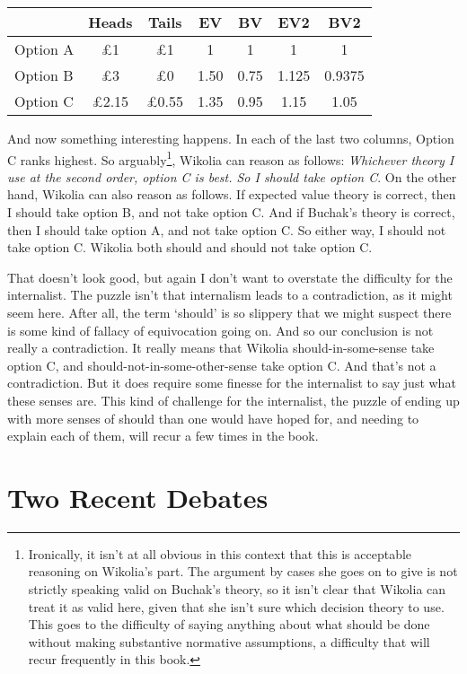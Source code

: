 \documentclass[
  10pt,
  letterpaper,
  twoside]{scrbook}
\begin{document}
\begin{longtable}[]{@{}lcccccc@{}}
\toprule\noalign{}
& Heads & Tails & EV & BV & EV2 & BV2 \\
\midrule\noalign{}
\endhead
\bottomrule\noalign{}
\endlastfoot
Option A & £1 & £1 & 1 & 1 & 1 & 1 \\
Option B & £3 & £0 & 1.50 & 0.75 & 1.125 & 0.9375 \\
Option C & £2.15 & £0.55 & 1.35 & 0.95 & 1.15 & 1.05 \\
\end{longtable}

And now something interesting happens. In each of the last two columns,
Option C ranks highest. So arguably\footnote{Ironically, it isn't at all
  obvious in this context that this is acceptable reasoning on Wikolia's
  part. The argument by cases she goes on to give is not strictly
  speaking valid on Buchak's theory, so it isn't clear that Wikolia can
  treat it as valid here, given that she isn't sure which decision
  theory to use. This goes to the difficulty of saying anything about
  what should be done without making substantive normative assumptions,
  a difficulty that will recur frequently in this book.}, {Wikolia} can
reason as follows: \emph{Whichever theory I use at the second order,
option C is best. So I should take option C}. On the other hand,
{Wikolia} can also reason as follows. If expected value theory is
correct, then I should take option B, and not take option C. And if
Buchak's theory is correct, then I should take option A, and not take
option C. So either way, I should not take option C. {Wikolia} both
should and should not take option C.

That doesn't look good, but again I don't want to overstate the
difficulty for the internalist. The puzzle isn't that internalism leads
to a contradiction, as it might seem here. After all, the term `should'
is so slippery that we might suspect there is some kind of fallacy of
equivocation going on. And so our conclusion is not really a
contradiction. It really means that {Wikolia} should-in-some-sense take
option C, and should-not-in-some-other-sense take option C. And that's
not a contradiction. But it does require some finesse for the
internalist to say just what these senses are. This kind of challenge
for the internalist, the puzzle of ending up with more senses of should
than one would have hoped for, and needing to explain each of them, will
recur a few times in the book.

\section{Two Recent Debates}\label{tworecentdebates}
\end{document}
